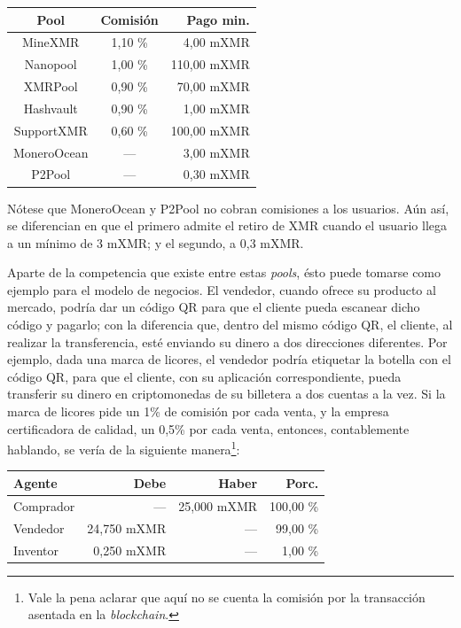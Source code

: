 \documentclass[12pt,a4paper]{article}
\begin{document}
\begin{center}
\begin{tabular}{|c|c|r|}
\hline 
\textbf{Pool} & \textbf{Comisión} & \textbf{Pago min.} \\ 
\hline 
MineXMR & 1,10 \% & 4,00 mXMR \\ 
\hline 
Nanopool & 1,00 \% & 110,00 mXMR \\ 
\hline 
XMRPool & 0,90 \% & 70,00 mXMR \\ 
\hline 
Hashvault & 0,90 \% & 1,00 mXMR \\ 
\hline 
SupportXMR & 0,60 \% & 100,00 mXMR \\ 
\hline 
MoneroOcean & — & 3,00 mXMR \\ 
\hline 
P2Pool & — & 0,30 mXMR \\ 
\hline 
\end{tabular} 
\end{center}

Nótese que MoneroOcean y P2Pool no cobran comisiones a los usuarios. Aún así, se diferencian en que el primero admite el retiro de XMR cuando el usuario llega a un mínimo de 3 mXMR; y el segundo, a 0,3 mXMR.

Aparte de la competencia que existe entre estas \textit{pools}, ésto puede tomarse como ejemplo para el modelo de negocios. El vendedor, cuando ofrece su producto al mercado, podría dar un código QR para que el cliente pueda escanear dicho código y pagarlo; con la diferencia que, dentro del mismo código QR, el cliente, al realizar la transferencia, esté enviando su dinero a dos direcciones diferentes. Por ejemplo, dada una marca de licores, el vendedor podría etiquetar la botella con el código QR, para que el cliente, con su aplicación correspondiente, pueda transferir su dinero en criptomonedas de su billetera a dos cuentas a la vez. Si la marca de licores pide un 1\% de comisión por cada venta, y la empresa certificadora de calidad, un 0,5\% por cada venta, entonces, contablemente hablando, se vería de la siguiente manera\footnote{Vale la pena aclarar que aquí no se cuenta la comisión por la transacción asentada en la \textit{blockchain}.}:

\begin{center}
\begin{tabular}{|l|r|r|r|}
\hline 
\textbf{Agente} & \textbf{Debe} & \textbf{Haber} & \textbf{Porc.} \\ 
\hline 
Comprador & — & 25,000 mXMR & 100,00 \% \\ 
\hline 
Vendedor & 24,750 mXMR & — & 99,00 \% \\
\hline 
Inventor & 0,250 mXMR & — & 1,00 \% \\ 
\hline 
\end{tabular} 
\end{center}
\end{document}
